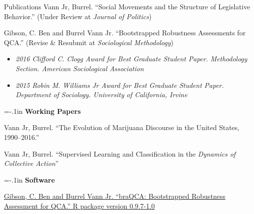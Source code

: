 \documentclass{resume} %
\begin{document}
\begin{rSection}{Publications}
\vspace*{5pt}
Vann Jr, Burrel. ``Social Movements and the Structure of Legislative Behavior.'' (Under Review at \textit{Journal of Politics})

\vspace*{5pt}
Gibson, C. Ben and Burrel Vann Jr. ``Bootstrapped Robustness Assessments for QCA.'' (Revise \& Resubmit at {\it{Sociological Methodology}})\vspace*{-.75em} 
\begin{itemize}[leftmargin=.25in]
	\item {\footnotesize \it 2016 Clifford C. Clogg Award for Best Graduate Student Paper. Methodology Section. American Sociological Association}\vspace*{-.75em} 
	\item {\footnotesize \it 2015 Robin M. Williams Jr Award for Best Graduate Student Paper. Department of Sociology. University of California, Irvine}
\end{itemize}
 \vspace*{8pt}


{\parindent=-.1in {\bf Working Papers}}

\raggedright
Vann Jr, Burrel. ``The Evolution of Marijuana Discourse in the United States, 1990--2016.'' 
\vspace*{5pt}

Vann Jr, Burrel. ``Supervised Learning and Classification in the {\it{Dynamics of Collective Action}}''

 \vspace*{8pt}

{\parindent=-.1in {\bf Software}}

\href{https://cran.r-project.org/web/packages/braQCA/braQCA.pdf}{Gibson, C. Ben and Burrel Vann Jr. ``braQCA: Bootstrapped Robustness Assessment for QCA.'' R package version 0.9.7-1.0}
\end{rSection}




\end{document}
